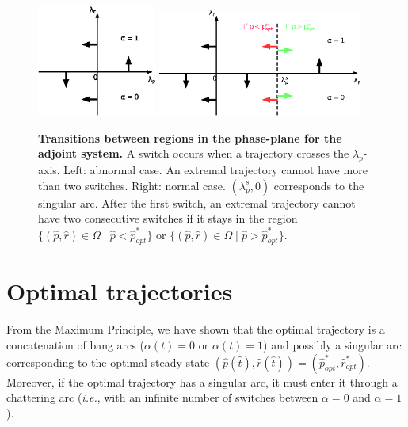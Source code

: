 \documentclass[a4paper,12pt]{article}
\newcommand{\tr}[1]{{#1}}
\begin{document}
\begin{figure}[h]
\centering
\includegraphics[width=0.35\textwidth]{Fig/adj2ab.eps} 
\includegraphics[width=0.6\textwidth]{Fig/adj2.eps} 
\caption{\textbf{Transitions between regions in the phase-plane for the adjoint system.} A switch occurs when a trajectory crosses the $\lambda_p$-axis. \tr{ Left: abnormal case. An extremal trajectory cannot have more than two switches. Right: normal case.} $(\lambda_p^s,0)$ corresponds to the singular arc.  After the first switch, an extremal trajectory cannot have two consecutive switches if it stays in the region $\{(\hat{p},\hat{r})\in \Omega \mid \hat{p}<\hat{p}_{opt}^*\}$ or $\{(\hat{p},\hat{r})\in \Omega \mid \hat{p}>\hat{p}_{opt}^*\}$.}
\label{fig-adj}                               
\end{figure} 


\section{Optimal trajectories}

From the Maximum Principle, we have shown that the optimal trajectory is a concatenation of bang arcs ($\alpha(t)=0$ or $\alpha(t)=1$) and possibly a singular arc corresponding to the optimal steady state $(\hat{p}(\hat{t}),\hat{r}(\hat{t}))=(\hat{p}_{opt}^*,\hat{r}_{opt}^*)$. Moreover, if the optimal trajectory has a singular arc, it must enter it through a chattering arc (\textit{i.e.}, with an infinite number of switches between $\alpha=0$ and $\alpha=1$).
\end{document}

